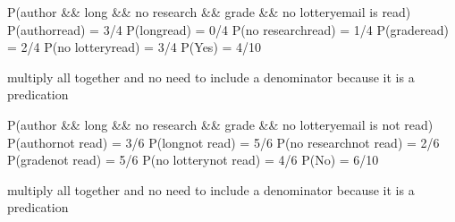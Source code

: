 \documentclass[11pt]{article}
\begin{document}
P(author \&\& long \&\& no research \&\& grade \&\& no
lottery\textbar{}email is read) P(author\textbar{}read) = 3/4
P(long\textbar{}read) = 0/4 P(no research\textbar{}read) = 1/4
P(grade\textbar{}read) = 2/4 P(no lottery\textbar{}read) = 3/4 P(Yes) =
4/10

multiply all together and no need to include a denominator because it is
a predication

P(author \&\& long \&\& no research \&\& grade \&\& no
lottery\textbar{}email is not read) P(author\textbar{}not read) = 3/6
P(long\textbar{}not read) = 5/6 P(no research\textbar{}not read) = 2/6
P(grade\textbar{}not read) = 5/6 P(no lottery\textbar{}not read) = 4/6
P(No) = 6/10

multiply all together and no need to include a denominator because it is
a predication
\end{document}
